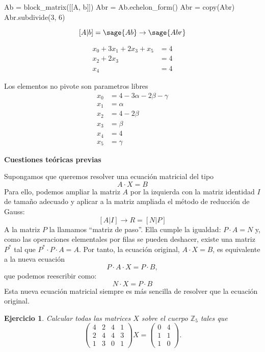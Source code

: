 \documentclass{amsart}
\newtheorem{ejer}{Ejercicio}
\begin{document}

\begin{sageblock}
	Ab = block_matrix([[A, b]])
	Abr = Ab.echelon_form()
	Abr = copy(Abr)
	Abr.subdivide(3, 6)
\end{sageblock}

$$
	[A|b] = \sage{Ab} \to \sage{Abr}
$$

\begin{align*}
	x_0 + 3x_1 + 2x_3 + x_5 &= 4 \\
	x_2 + 2x_3 &= 4 \\
	x_4 &= 4
\end{align*}

Los elementos no pivote son parametros libres
\begin{align*}
	x_0 &= 4 -3\alpha -2\beta -\gamma \\
	x_1 &= \alpha \\
	x_2 &= 4 - 2\beta \\
	x_3 &= \beta \\
	x_4 &= 4 \\
	x_5 &= \gamma
\end{align*}



\newpage




\begin{tcolorbox}[colback = orange!120!white]
{\bf Cuestiones teóricas previas}
\end{tcolorbox}

\begin{tcolorbox}[colback = orange!60!white]
Supongamos que queremos resolver una ecuación matricial del tipo $$ A\cdot X=B$$
Para ello, podemos ampliar la matriz $A$ por la izquierda con la matriz identidad $I$ de tamaño adecuado y aplicar a la matriz ampliada el método de reducción de Gauss: 
$$ [A|I] \rightarrow R=[N|P]$$
A la matriz $P$ la llamamos ``matriz de paso''. Ella cumple la igualdad: $P\cdot A=N$ y, como las operaciones elementales por filas se pueden deshacer, existe una matriz $P^*$ tal que $P^*\cdot P\cdot A=A$. Por tanto, la ecuación original, $ A\cdot X=B$,  es equivalente a la nueva ecuación
$$P\cdot A\cdot X= P\cdot B,$$
que podemos reescribir como:
$$ N\cdot X=P\cdot B$$
Esta nueva ecuación matricial siempre es más sencilla de resolver que la ecuación original.
\end{tcolorbox}

\begin{ejer}
Calcular todas las matrices $X$ sobre el cuerpo ${\mathbb Z}_5$ tales que 
$$ \left(\begin{array}{rrrr}
4 & 2 & 4 & 1 \\
2 & 4 & 4 & 3 \\
1 & 3 & 0 & 1
\end{array}\right) X 
= \left(\begin{array}{rr}
0 & 4 \\
1 & 1 \\
1 & 0
\end{array}\right).$$
\end{ejer}
\end{document}

